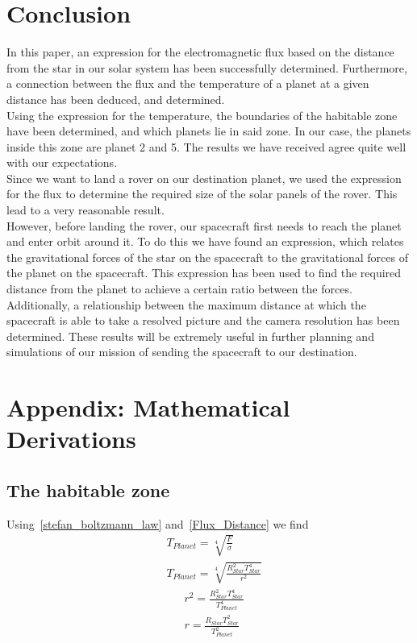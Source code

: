 \documentclass[reprint,english,notitlepage]{revtex4-2}
\begin{document}
\section{Conclusion} \label{sec:conclusion}
	In this paper, an expression for the electromagnetic flux based on the distance from the star in our solar system has been successfully determined.
	Furthermore, a connection between the flux and the temperature of a planet at a given distance has been deduced, and determined.\\
	Using the expression for the temperature, the boundaries of the habitable zone have been determined, and which planets lie in said zone.
	In our case, the planets inside this zone are planet 2 and 5.
	The results we have received agree quite well with our expectations.\\
	Since we want to land a rover on our destination planet, we used the expression for the flux to determine the required size of the solar panels of the rover.
	This lead to a very reasonable result.\\
	However, before landing the rover, our spacecraft first needs to reach the planet and enter orbit around it.
	To do this we have found an expression, which relates the gravitational forces of the star on the spacecraft to the gravitational forces of the planet on the spacecraft.
	This expression has been used to find the required distance from the planet to achieve a certain ratio between the forces.\\
	Additionally, a relationship between the maximum distance at which the spacecraft is able to take a resolved picture and the camera resolution has been determined.
	These results will be extremely useful in further planning and simulations of our mission of sending the spacecraft to our destination.

\section{Appendix: Mathematical Derivations}
	\subsection{The habitable zone}\label{subsec:app-the-habitable-zone}
	Using~\eqref{stefan_boltzmann_law} and~\eqref{Flux_Distance} we find
	\begin{align}
		&T_{Planet} = \sqrt[4]{\frac{F}{\sigma}}\\
		&T_{Planet} = \sqrt[4]{\frac{R_{Star}^2 T_{Star}^4}{r^2}} \label{Planet_temp}
	\end{align}
	\begin{align}
		&r^2 = \frac{R_{Star}^2 T_{Star}^4}{T_{Planet}^4}\\
		&r = \frac{R_{Star} T_{Star}^2}{T_{Planet}^2}
	\end{align}
\end{document}
